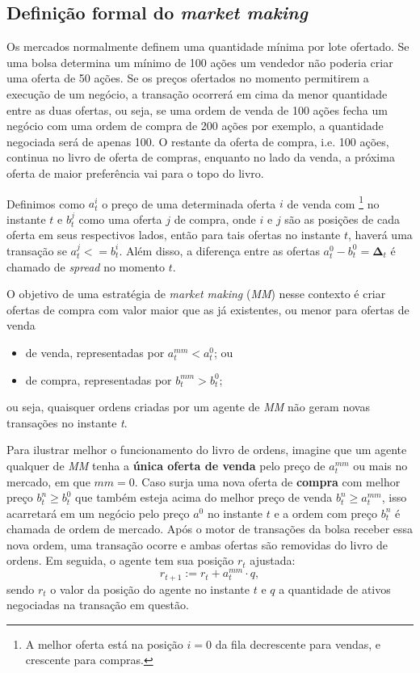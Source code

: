 \subsection{Definição formal do \textit{market making}}

Os mercados normalmente definem uma quantidade mínima por lote ofertado. Se uma bolsa determina um mínimo de 100 ações um vendedor não poderia criar uma oferta de 50 ações. Se os preços ofertados no momento permitirem a execução de um negócio, a transação ocorrerá em cima da menor quantidade entre as duas ofertas, ou seja, se uma ordem de venda de 100 ações fecha um negócio com uma ordem de compra de 200 ações por exemplo, a quantidade negociada será de apenas 100. O restante da oferta de compra, i.e. 100 ações, continua no livro de oferta de compras, enquanto no lado da venda, a próxima oferta de maior preferência vai para o topo do livro. 

Definimos como $a^{i}_{t}$ o preço de uma determinada oferta $i$ de venda com \footnote{A melhor oferta está na posição $i = 0$ da fila decrescente para vendas, e crescente para compras.} no instante $t$ e $b^{j}_{t}$ como uma oferta $j$ de compra, onde $i$ e $j$ são as posições de cada oferta em seus respectivos lados, então para tais ofertas no instante $t$, haverá uma transação se $a^{j}_{t} <= b^{i}_{t}$. Além disso, a diferença entre as ofertas $a^{0}_{t} - b^{0}_{t} = \mathbf{\Delta}_t$ é chamado de \textit{spread} no momento $t$.

O objetivo de uma estratégia de \textit{market making} (\textit{MM}) nesse contexto é criar ofertas de compra com valor maior que as já existentes, ou menor para ofertas de venda

\begin{itemize}
    \item de venda, representadas por $a^{mm}_{t} < a^{0}_{t}$; ou 
    \item de compra, representadas por $b^{mm}_{t} > b^{0}_{t}$;
\end{itemize}
ou seja, quaisquer ordens criadas por um agente de \textit{MM} não geram novas transações no instante \textit{t}.

Para ilustrar melhor o funcionamento do livro de ordens, imagine que um agente qualquer de \textit{MM} tenha a \textbf{única oferta de venda} pelo preço de $a^{mm}_{t}$ ou mais no mercado, em que $mm = 0$. Caso surja uma nova oferta de \textbf{compra} com melhor preço $b^{n}_{t} \geq b^{0}_{t}$ que também esteja acima do melhor preço de venda $b^{n}_{t} \geq a^{mm}_{t}$, isso acarretará em um negócio pelo preço $a^{0}$ no instante $t$ e a ordem com preço $b^{n}_{t}$ é chamada de ordem de mercado. Após o motor de transações da bolsa receber essa nova ordem, uma transação ocorre e ambas ofertas são removidas do livro de ordens. Em seguida, o agente tem sua posição $r_{t}$ ajustada:
\begin{equation}
    r_{t + 1}:= r_{t} + a^{mm}_{t}\cdot q,
\end{equation}
sendo $r_{t}$ o valor da posição do agente no instante $t$ e $q$ a quantidade de ativos negociadas na transação em questão.

